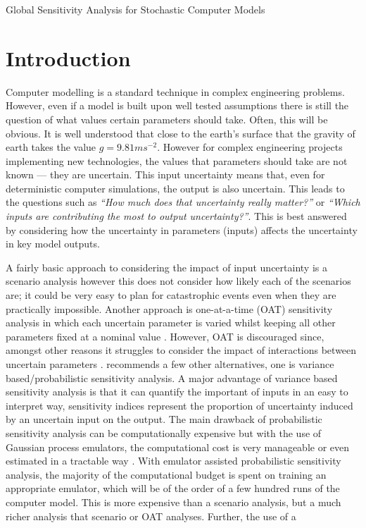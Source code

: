 \begin{chapter}{Global Sensitivity Analysis for Stochastic Computer Models}
\section{Introduction}
Computer modelling is a standard technique in complex engineering problems. However, even if a model is built upon well tested assumptions there is still the question of what values certain parameters should take. Often, this will be obvious. It is well understood that close to the earth's surface that the gravity of earth takes the value $g = 9.81ms^{-2}$. However for complex engineering projects implementing new technologies, the values that parameters should take are not known --- they are uncertain. This input uncertainty means that, even for deterministic computer simulations, the output is also uncertain. This leads to the questions such as \textit{``How much does that uncertainty really matter?''} or \textit{``Which inputs are contributing the most to output uncertainty?''}. This is best answered by considering how the uncertainty in parameters (inputs) affects the uncertainty in key model outputs.

A fairly basic approach to considering the impact of input uncertainty is a scenario analysis  \citep{Zhang2012, Grewal2013} however this does not consider how likely each of the scenarios are; it could be very easy to plan for catastrophic events even when they are practically impossible. Another approach is one-at-a-time (OAT) sensitivity analysis in which each uncertain parameter is varied whilst keeping all other parameters fixed at a nominal value \citep{Holvoet2005}. However, OAT is discouraged since, amongst other reasons it struggles to consider the impact of interactions between uncertain parameters \citep{Saltelli2010}. \citet{Saltelli2010} recommends a few other alternatives, one is variance based/probabilistic sensitivity analysis. A major advantage of variance based sensitivity analysis is that it can quantify the important of inputs in an easy to interpret way, sensitivity indices represent the proportion of uncertainty induced by an uncertain input on the output. The main drawback of probabilistic sensitivity analysis can be computationally expensive but with the use of Gaussian process emulators, the computational cost is very manageable \cite{Marrel2012} or even estimated in a tractable way \citep{Oakley04}. With emulator assisted probabilistic sensitivity analysis, the majority of the computational budget is spent on training an appropriate emulator, which will be of the order of a few hundred runs of the computer model. This is more expensive than a scenario analysis, but a much richer analysis that scenario or OAT analyses. Further, the use of a 


\end{chapter}
